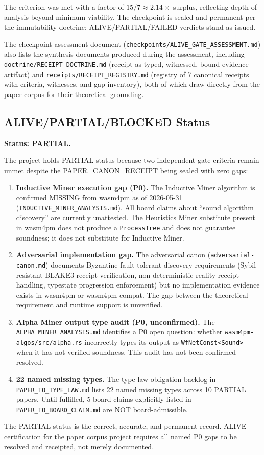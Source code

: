 The criterion was met with a factor of $15/7 \approx 2.14\times$ surplus,
reflecting depth of analysis beyond minimum viability. The checkpoint is
sealed and permanent per the immutability doctrine: ALIVE/PARTIAL/FAILED
verdicts stand as issued.

The checkpoint assessment document (\texttt{checkpoints/ALIVE\_GATE\_ASSESSMENT.md})
also lists the synthesis documents produced during the assessment, including
\texttt{doctrine/RECEIPT\_DOCTRINE.md} (receipt as typed, witnessed, bound
evidence artifact) and \texttt{receipts/RECEIPT\_REGISTRY.md} (registry of
7 canonical receipts with criteria, witnesses, and gap inventory), both of
which draw directly from the paper corpus for their theoretical grounding.

\subsection{ALIVE/PARTIAL/BLOCKED Status}
\label{sec:sources-papers-evidence-status}

\textbf{Status: PARTIAL.}

The project holds PARTIAL status because two independent gate criteria remain
unmet despite the PAPER\_CANON\_RECEIPT being sealed with zero gaps:

\begin{enumerate}
  \item \textbf{Inductive Miner execution gap (P0).} The Inductive Miner
    algorithm is confirmed MISSING from wasm4pm as of 2026-05-31
    (\texttt{INDUCTIVE\_MINER\_ANALYSIS.md}). All board claims about ``sound
    algorithm discovery'' are currently unattested. The Heuristics Miner
    substitute present in wasm4pm does not produce a \texttt{ProcessTree} and
    does not guarantee soundness; it does not substitute for Inductive Miner.

  \item \textbf{Adversarial implementation gap.} The adversarial canon
    (\texttt{adversarial-canon.md}) documents Byzantine-fault-tolerant
    discovery requirements (Sybil-resistant BLAKE3 receipt verification,
    non-deterministic reality receipt handling, typestate progression
    enforcement) but no implementation evidence exists in wasm4pm or
    wasm4pm-compat. The gap between the theoretical requirement and runtime
    support is unverified.

  \item \textbf{Alpha Miner output type audit (P0, unconfirmed).} The
    \texttt{ALPHA\_MINER\_ANALYSIS.md} identifies a P0 open question: whether
    \texttt{wasm4pm-algos/src/alpha.rs} incorrectly types its output as
    \texttt{WfNetConst<Sound>} when it has not verified soundness. This audit
    has not been confirmed resolved.

  \item \textbf{22 named missing types.} The type-law obligation backlog in
    \texttt{PAPER\_TO\_TYPE\_LAW.md} lists 22 named missing types across 10
    PARTIAL papers. Until fulfilled, 5 board claims explicitly listed in
    \texttt{PAPER\_TO\_BOARD\_CLAIM.md} are NOT board-admissible.
\end{enumerate}

The PARTIAL status is the correct, accurate, and permanent record. ALIVE
certification for the paper corpus project requires all named P0 gaps to be
resolved and receipted, not merely documented.
